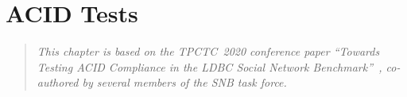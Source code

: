 \chapter{ACID Tests}
\label{sec:acid}

\newcommand{\bl}[1]{\textcolor{blue}{#1}}
\newcommand{\rd}[1]{\textcolor{red}{#1}}
\newcommand{\gn}[1]{\textcolor{green}{#1}}
\newcommand{\gy}[1]{\textcolor{grey}{\textit{#1}}}

\newcommand{\level}[1]{\textsf{#1}}
\newcommand{\anomaly}[1]{\rd{#1}}
\newcommand{\anolong}[1]{\emph{\rd{#1}}}
\newcommand{\tx}[1]{#1}

\newcommand{\cmark}{\ding{51}}
\newcommand{\xmark}{\ding{55}}


\begin{quote}
  \textit{This chapter is based on the TPCTC~2020 conference paper ``Towards Testing ACID Compliance in the LDBC Social Network Benchmark''~\cite{tpctc_acid}, co-authored by several members of the SNB task force.}
\end{quote}

